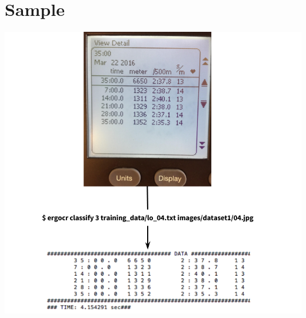 \documentclass[a4paper,12pt]{article}
\begin{document}
\section{Sample}
\includegraphics[width=\textwidth]{sample}
\end{document}

